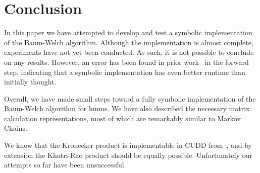 % 

\section{Conclusion}\label{sec:conclusion}

In this paper we have attempted to develop and test a symbolic implementation of the Baum-Welch algorithm.
Although the implementation is almost complete, experiments have not yet been conducted.
As such, it is not possible to conclude on any results.
However, an error has been found in prior work~\cite{p7} in the forward step, indicating that a symbolic implementation has even better runtime than initially thought.

Overall, we have made small steps toward a fully symbolic implementation of the Baum-Welch algorithm for \glspl{hmm}.
We have also described the necessary matrix calculation representations, most of which are remarkably similar to Markov Chains.

We know that the Kronecker product is implementable in CUDD from~\cite{davidkebo-kronecker}, and by extension the Khatri-Rao product should be equally possible.
Unfortunately our attempts so far have been unsuccessful.